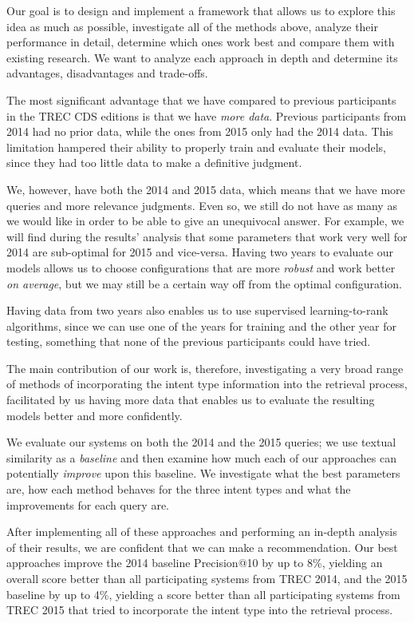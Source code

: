 Our goal is to design and implement a framework that allows us
to explore this idea as much as possible, investigate all of the methods above,
analyze their performance in detail,
determine which ones work best and compare them with existing research.
We want to analyze each approach in depth and determine its advantages, disadvantages and trade-offs.

The most significant advantage that we have compared to previous participants in the TREC CDS editions is
that we have \emph{more data}. Previous participants from 2014 had no prior data, while the ones from 2015
only had the 2014 data. This limitation hampered their ability to properly train and evaluate their models, since they
had too little data to make a definitive judgment.

We, however, have both the 2014 and 2015 data, which means that
we have more queries and more relevance judgments.
Even so, we still do not have as many as we would like in order to be able to give an unequivocal answer.
For example, we will find during the results' analysis
that some parameters that work very well for 2014 are sub-optimal for 2015 and vice-versa.
Having two
years to evaluate our models allows us to choose configurations that are more \emph{robust} and work better \emph{on average}, but we
may still be a certain way off from the optimal configuration.

Having data from two years also
enables us to use supervised learning-to-rank algorithms,
since we can use one of the years for training and the other year for testing,
something that none of the previous participants could have tried.

The main contribution of our work is, therefore, investigating a very broad range of methods of incorporating
the intent type information into the retrieval process,
facilitated by us having more data that enables us to evaluate the resulting models better and more confidently.

We evaluate our systems on both the 2014 and the 2015 queries; we use textual similarity
as a \emph{baseline} and then examine how much each of our approaches can potentially \emph{improve} upon this baseline.
We investigate what the best parameters are, how each method behaves for the three
intent types and what the improvements for each query are.

After implementing all of these approaches and performing an in-depth analysis of their results,
we are confident that we can make a recommendation.
Our best approaches improve the 2014 baseline Precision@10 by up to 8\%, yielding an overall
score better than all participating systems from TREC 2014,
and the 2015 baseline by up to 4\%, yielding a score better than all participating
systems from TREC 2015 that tried to incorporate the intent
type into the retrieval process.


